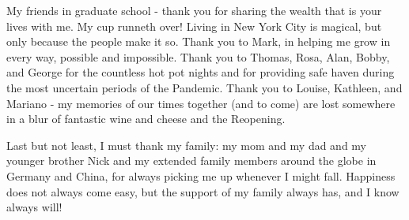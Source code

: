 \documentclass[phd,tocprelim]{cornell}
\begin{document}
\begin{acknowledgements}
My friends in graduate school - thank you for sharing the wealth that is your lives with me. My cup runneth over! Living in New York City is magical, but only because the people make it so. Thank you to Mark, in helping me grow in every way, possible and impossible. Thank you to Thomas, Rosa, Alan, Bobby, and George for the countless hot pot nights and for providing safe haven during the most uncertain periods of the Pandemic. Thank you to Louise, Kathleen, and Mariano - my memories of our times together (and to come) are lost somewhere in a blur of fantastic wine and cheese and the Reopening.

Last but not least, I must thank my family: my mom and my dad and my younger brother Nick and my extended family members around the globe in Germany and China, for always picking me up whenever I might fall. Happiness does not always come easy, but the support of my family always has, and I know always will!
\end{acknowledgements}

\contentspage
\tablelistpage
\figurelistpage

\normalspacing \setcounter{page}{1} 
\pagestyle{cornell} \addtolength{\parskip}{0.5\baselineskip}

\end{document}
